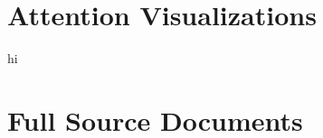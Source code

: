 \documentclass[12pt]{report}
\begin{document}
\begin{appendices}

\chapter{Attention Visualizations}
\label{appendix:attn}
hi

\chapter{Full Source Documents}
\label{appendix:full_docs}

\end{appendices}
\end{document}

